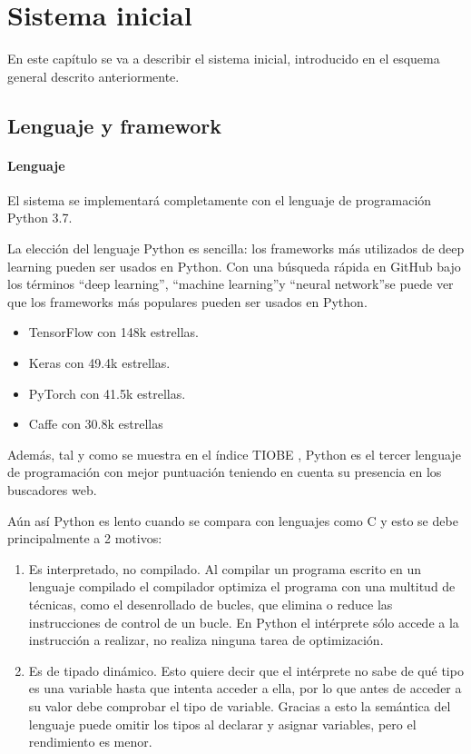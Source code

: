 \chapter{Sistema inicial}\label{initial_system}

En este capítulo se va a describir el sistema inicial, introducido en el esquema general descrito anteriormente.

\section{Lenguaje y framework}\label{sec:language_and_framework}

\subsubsection{Lenguaje}\label{subsec:language}

El sistema se implementará completamente con el lenguaje de programación Python 3.7.

La elección del lenguaje Python es sencilla: los frameworks más utilizados de deep learning pueden ser usados en Python. Con una búsqueda rápida en GitHub bajo los términos ``deep learning'', ``machine learning''\phantom{1}y ``neural network''\phantom{1}se puede ver que los frameworks más populares pueden ser usados en Python.
\begin{itemize}
\item TensorFlow con 148k estrellas.
\item Keras con 49.4k estrellas.
\item PyTorch con 41.5k estrellas.
\item Caffe con 30.8k estrellas
\end{itemize}

Además, tal y como se muestra en el índice TIOBE \cite{Tiobe2020}, Python es el tercer lenguaje de programación con mejor puntuación teniendo en cuenta su presencia en los buscadores web.

Aún así Python es lento cuando se compara con lenguajes como C y esto se debe principalmente a 2 motivos:
\begin{enumerate}
\item Es interpretado, no compilado. Al compilar un programa escrito en un lenguaje compilado el compilador optimiza el programa con una multitud de técnicas, como el desenrollado de bucles, que elimina o reduce las instrucciones de control de un bucle. En Python el intérprete sólo accede a la instrucción a realizar, no realiza ninguna tarea de optimización.
\item Es de tipado dinámico. Esto quiere decir que el intérprete no sabe de qué tipo es una variable hasta que intenta acceder a ella, por lo que antes de acceder a su valor debe comprobar el tipo de variable. Gracias a esto la semántica del lenguaje puede omitir los tipos al declarar y asignar variables, pero el rendimiento es menor.
\end{enumerate}

